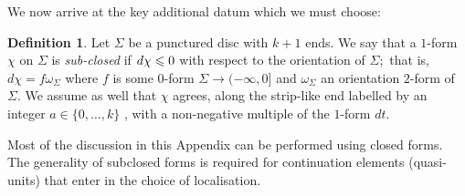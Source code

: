 \documentclass{article}
\theoremstyle{plain}%
\theoremstyle{definition}
\newtheorem{dfn}[thm]{Definition}
\numberwithin{equation}{section}
\numberwithin{figure}{section}
\def\le{\leqslant\nobreak}
\def\om{\omega}
\def\Si{\Sigma}
\def\iy{\infty}
\begin{document}
We now arrive at the key additional datum which we must choose:
\begin{dfn}
 
Let $\Si$ be a punctured disc with $k+1$ ends. We say that a $1$-form $\chi$ on $\Si$ is {\it sub-closed} if $d\chi\le0$ with respect to the orientation of $\Si;$ that is, $d\chi=f\om_\Si$ where $f$ is some $0$-form $\Si\to(-\iy,0]$ and $\om_\Si$ an orientation $2$-form of $\Si.$  We assume as well that $\chi$ agrees,  along the strip-like end labelled by an integer $a \in \{0, \ldots, k\} $ , with a non-negative multiple of the $1$-form $dt$.
\end{dfn}
Most of the discussion in this Appendix can be performed using closed forms. The generality of subclosed forms is required for continuation elements (quasi-units) that enter in the choice of localisation.
\end{document}

